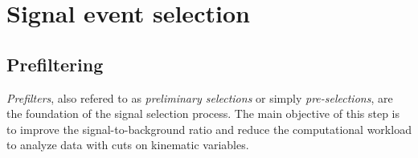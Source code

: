 \chapter{Signal event selection}
\label{cap:event_selection}

\section{Prefiltering}
\label{sec:prefilter}
\textit{Prefilters}, also refered to as \textit{preliminary selections} or simply \textit{pre-selections}, are the foundation of the signal selection process.
The main objective of this step is to improve the signal-to-background ratio and reduce the computational workload to analyze data with cuts on kinematic variables.

